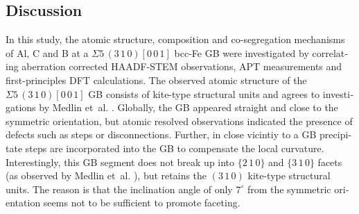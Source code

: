\documentclass[12pt,a4paper,twoside,twocolumn,english,english]{article}
\begin{document}
\begin{otherlanguage}{english}
\section*{Discussion}
In this study, the atomic structure, composition and co-segregation mechanisms of Al, C and B at a $\Sigma 5\,(3\,1\,0) [0\,0\,1]$ bcc-Fe GB were investigated by correlating aberration corrected HAADF-STEM observations, APT measurements and first-principles DFT calculations. The observed atomic structure of the $\Sigma 5\,(3\,1\,0) [0\,0\,1]$ GB consists of kite-type structural units and agrees to investigations by Medlin et~al. \cite{medlin_defect_2017}. Globally, the GB appeared straight and close to the symmetric orientation, but atomic resolved observations indicated the presence of defects such as steps or disconnections. Further, in close vicintiy to a GB precipitate steps are incorporated into the GB to compensate the local curvature. Interestingly, this GB segment does not break up into $\{2\,1\,0\}$ and $\{3\,1\,0\}$ facets (as observed by Medlin et~al. \cite{medlin_defect_2017}), but retains the $(3\,1\,0)$ kite-type structural units. The reason is that the inclination angle of only $7^\circ$ from the symmetric orientation seems not to be sufficient to promote faceting.


\end{otherlanguage}
\end{document}
